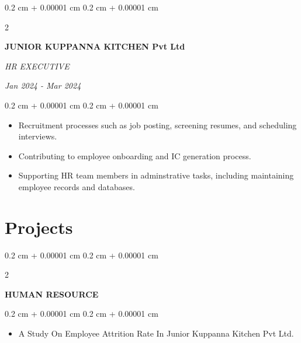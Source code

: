 \documentclass[10pt, letterpaper]{article}
\newenvironment{highlights}{
    \begin{itemize}[
        topsep=0.10 cm,
        parsep=0.10 cm,
        partopsep=0pt,
        itemsep=0pt,
        leftmargin=0.4 cm + 10pt
    ]
}{
    \end{itemize}
} %
\newenvironment{onecolentry}{
    \begin{adjustwidth}{
        0.2 cm + 0.00001 cm
    }{
        0.2 cm + 0.00001 cm
    }
}{
    \end{adjustwidth}
} %
\newenvironment{twocolentry}[2][]{
    \onecolentry
    \def\secondColumn{#2}
    \setcolumnwidth{\fill, 4.5 cm}
    \begin{paracol}{2}
}{
    \switchcolumn \raggedleft \secondColumn
    \end{paracol}
    \endonecolentry
} %
\begin{document}
        
        \begin{twocolentry}{
          
            
        \textit{Jan 2024 - Mar 2024 }}
            \textbf{JUNIOR KUPPANNA KITCHEN Pvt Ltd}
            
            \textit{HR EXECUTIVE}
        \end{twocolentry}

        \vspace{0.10 cm}
        \begin{onecolentry}
            \begin{highlights}
                \item Recruitment processes such as job posting, screening resumes, and scheduling interviews.
                \item Contributing to employee onboarding and IC generation process.
                \item Supporting HR team members in adminstrative tasks, including maintaining employee records and databases.
            \end{highlights}
        \end{onecolentry}


        \vspace{0.2 cm}

    
    \section{Projects}



        
        \begin{twocolentry}{
            
            
        \textit{{}}}
            \textbf{HUMAN RESOURCE}
            
        \end{twocolentry}
        

        \vspace{0.10 cm}
        \begin{onecolentry}
            \begin{highlights}
                \item A Study On Employee Attrition Rate In Junior Kuppanna Kitchen Pvt Ltd.
            \end{highlights}
        \end{onecolentry}


        \vspace{0.2 cm}
\end{document}
